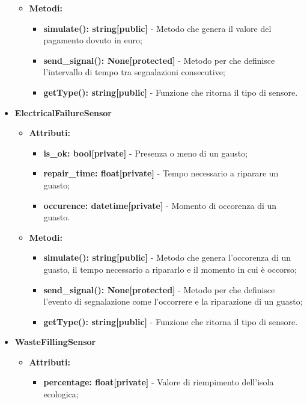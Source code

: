 \documentclass[8pt]{article}
\begin{document}
\begin{itemize}
\begin{itemize}
        \item \textbf{Metodi:}
        \begin{itemize}
            \item \textbf{simulate(): string[public]} - Metodo che genera il valore del pagamento dovuto in euro;
            \item \textbf{send\_signal(): None[protected]} - Metodo per che definisce l'intervallo di tempo tra segnalazioni consecutive;
            \item \textbf{getType(): string[public]} - Funzione che ritorna il tipo di sensore.
        \end{itemize}
    \end{itemize}
    \item \textbf{ElectricalFailureSensor}
    \begin{itemize}
        \item \textbf{Attributi:}
        \begin{itemize}
            \item \textbf{is\_ok: bool[private]} - Presenza o meno di un gausto;
            \item \textbf{repair\_time: float[private]} - Tempo necessario a riparare un guasto;
            \item \textbf{occurence: datetime[private]} - Momento di occorenza di un guasto.
        \end{itemize}
        \item \textbf{Metodi:}
        \begin{itemize}
            \item \textbf{simulate(): string[public]} - Metodo che genera l'occorenza di un guasto, il tempo necessario a ripararlo e il momento in cui è occorso;
            \item \textbf{send\_signal(): None[protected]} - Metodo per che definisce l'evento di segnalazione come l'occorrere e la riparazione di un guasto;
            \item \textbf{getType(): string[public]} - Funzione che ritorna il tipo di sensore.
        \end{itemize}
    \end{itemize}
    \item \textbf{WasteFillingSensor}
    \begin{itemize}
        \item \textbf{Attributi:}
        \begin{itemize}
            \item \textbf{percentage: float[private]} - Valore di riempimento dell'isola ecologica;

\end{itemize}
\end{itemize}
\end{itemize}
\end{document}
